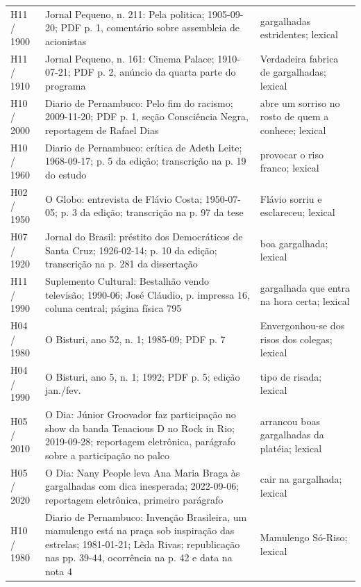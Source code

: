 \begin{longtable}{>{\raggedright\arraybackslash}p{}>{\raggedright\arraybackslash}p{}>{\raggedright\arraybackslash}p{}}
H11 / 1900 & Jornal Pequeno, n. 211: Pela politica; 1905-09-20; PDF p. 1, comentário sobre assembleia de acionistas & gargalhadas estridentes; lexical \cite{acervoD116} \\
H11 / 1910 & Jornal Pequeno, n. 161: Cinema Palace; 1910-07-21; PDF p. 2, anúncio da quarta parte do programa & Verdadeira fabrica de gargalhadas; lexical \cite{acervoD117} \\
H10 / 2000 & Diario de Pernambuco: Pelo fim do racismo; 2009-11-20; PDF p. 1, seção Consciência Negra, reportagem de Rafael Dias & abre um sorriso no rosto de quem a conhece; lexical \cite{acervoD118} \\
H10 / 1960 & Diario de Pernambuco: crítica de Adeth Leite; 1968-09-17; p. 5 da edição; transcrição na p. 19 do estudo & provocar o riso franco; lexical \cite{acervoD119} \\
H02 / 1950 & O Globo: entrevista de Flávio Costa; 1950-07-05; p. 3 da edição; transcrição na p. 97 da tese & Flávio sorriu e esclareceu; lexical \cite{acervoD120} \\
H07 / 1920 & Jornal do Brasil: préstito dos Democráticos de Santa Cruz; 1926-02-14; p. 10 da edição; transcrição na p. 281 da dissertação & boa gargalhada; lexical \cite{acervoD121} \\
H11 / 1990 & Suplemento Cultural: Bestalhão vendo televisão; 1990-06; José Cláudio, p. impressa 16, coluna central; página física 795 & gargalhada que entra na hora certa; lexical \cite{acervoD122} \\
H04 / 1980 & O Bisturi, ano 52, n. 1; 1985-09; PDF p. 7 & Envergonhou-se dos risos dos colegas; lexical \cite{acervoD123} \\
H04 / 1990 & O Bisturi, ano 5, n. 1; 1992; PDF p. 5; edição jan./fev. & tipo de risada; lexical \cite{acervoD124} \\
H05 / 2010 & O Dia: Júnior Groovador faz participação no show da banda Tenacious D no Rock in Rio; 2019-09-28; reportagem eletrônica, parágrafo sobre a participação no palco & arrancou boas gargalhadas da platéia; lexical \cite{acervoD125} \\
H05 / 2020 & O Dia: Nany People leva Ana Maria Braga às gargalhadas com dica inesperada; 2022-09-06; reportagem eletrônica, primeiro parágrafo & cair na gargalhada; lexical \cite{acervoD126} \\
H10 / 1980 & Diario de Pernambuco: Invenção Brasileira, um mamulengo está na praça sob inspiração das estrelas; 1981-01-21; Lêda Rivas; republicação nas pp. 39-44, ocorrência na p. 42 e data na nota 4 & Mamulengo Só-Riso; lexical \cite{acervoD127} \\

\end{longtable}
